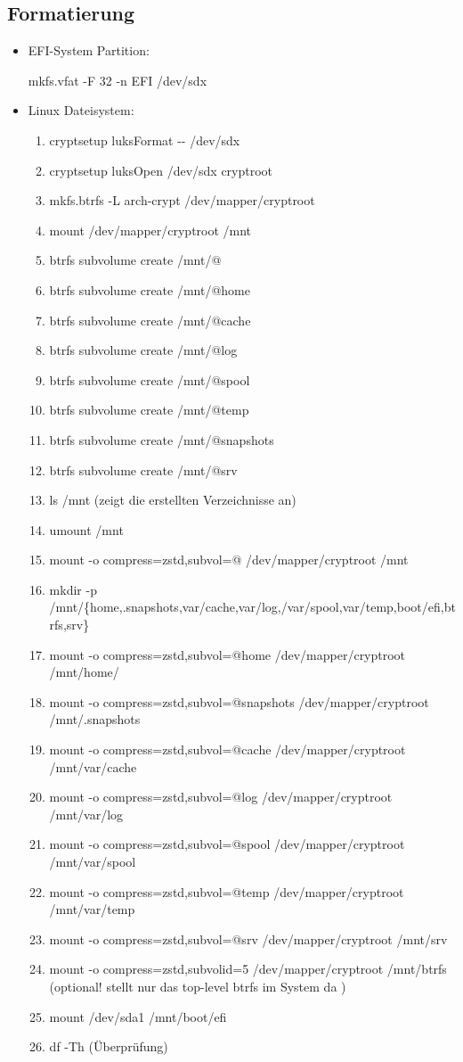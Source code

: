 \documentclass[11pt,a4paper]{article}
\begin{document}
\subsection{Formatierung}
\begin{itemize}
\item EFI-System Partition:

mkfs.vfat -F 32 -n EFI /dev/sdx

\item Linux Dateisystem:
\begin{enumerate}
\item cryptsetup luksFormat -{}-\textcolor{red}{}  /dev/sdx
\item cryptsetup luksOpen /dev/sdx 	cryptroot
\item mkfs.btrfs -L arch-crypt /dev/mapper/cryptroot
\item mount /dev/mapper/cryptroot /mnt
\item btrfs subvolume create /mnt/@
\item btrfs subvolume create /mnt/@home
\item btrfs subvolume create /mnt/@cache
\item btrfs subvolume create /mnt/@log
\item btrfs subvolume create /mnt/@spool
\item btrfs subvolume create /mnt/@temp
\item btrfs subvolume create /mnt/@snapshots
\item btrfs subvolume create /mnt/@srv
\item ls /mnt (zeigt die erstellten Verzeichnisse an)
\item umount /mnt
\item mount -o compress=zstd,subvol=@ /dev/mapper/cryptroot /mnt
\item mkdir -p /mnt/\{home,.snapshots,var/cache,var/log,/var/spool,var/temp,boot/efi,btrfs,srv\}
\item mount -o compress=zstd,subvol=@home /dev/mapper/cryptroot /mnt/home/
\item mount -o compress=zstd,subvol=@snapshots /dev/mapper/cryptroot /mnt/.snapshots
\item mount -o compress=zstd,subvol=@cache /dev/mapper/cryptroot /mnt/var/cache
\item mount -o compress=zstd,subvol=@log /dev/mapper/cryptroot /mnt/var/log
\item mount -o compress=zstd,subvol=@spool /dev/mapper/cryptroot /mnt/var/spool
\item mount -o compress=zstd,subvol=@temp /dev/mapper/cryptroot /mnt/var/temp
\item mount -o compress=zstd,subvol=@srv /dev/mapper/cryptroot /mnt/srv
\item mount -o compress=zstd,subvolid=5 /dev/mapper/cryptroot /mnt/btrfs (optional! stellt nur das top-level btrfs im System da )
\item mount /dev/sda1 /mnt/boot/efi
\item df -Th (Überprüfung)
\end{enumerate}
\end{itemize}
\end{document}
